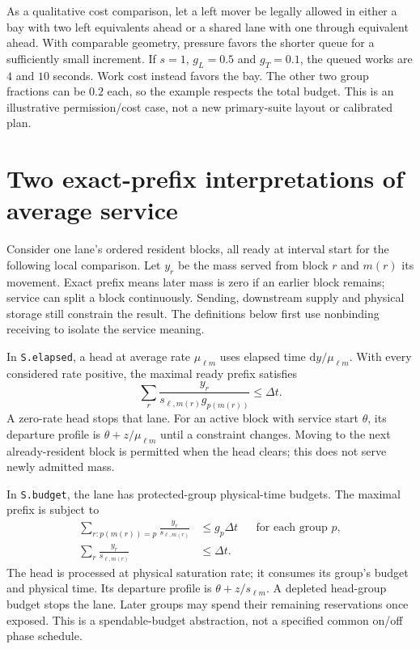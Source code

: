 \documentclass[11pt]{article}
\newcommand{\dd}{\mathrm d}
\begin{document}
As a qualitative cost comparison, let a left mover be legally allowed in either a bay with two left equivalents ahead or a shared lane with one through equivalent ahead. With comparable geometry, pressure favors the shorter queue for a sufficiently small increment. If $s=1$, $g_L=0.5$ and $g_T=0.1$, the queued works are $4$ and $10$ seconds. Work cost instead favors the bay. The other two group fractions can be $0.2$ each, so the example respects the total budget. This is an illustrative permission/cost case, not a new primary-suite layout or calibrated plan.

\section*{Two exact-prefix interpretations of average service}

Consider one lane's ordered resident blocks, all ready at interval start for the following local comparison. Let $y_r$ be the mass served from block $r$ and $m(r)$ its movement. Exact prefix means later mass is zero if an earlier block remains; service can split a block continuously. Sending, downstream supply and physical storage still constrain the result. The definitions below first use nonbinding receiving to isolate the service meaning.

In \texttt{S.elapsed}, a head at average rate $\mu_{\ell m}$ uses elapsed time $\dd y/\mu_{\ell m}$. With every considered rate positive, the maximal ready prefix satisfies
\begin{equation}
 \sum_r\frac{y_r}{s_{\ell,m(r)}g_{p(m(r))}}\le\Delta t.
 \label{eq:elapsed}
\end{equation}
A zero-rate head stops that lane. For an active block with service start $\theta$, its departure profile is $\theta+z/\mu_{\ell m}$ until a constraint changes. Moving to the next already-resident block is permitted when the head clears; this does not serve newly admitted mass.

In \texttt{S.budget}, the lane has protected-group physical-time budgets. The maximal prefix is subject to
\begin{align}
 \sum_{r:p(m(r))=p}\frac{y_r}{s_{\ell,m(r)}}&\le g_p\Delta t
 &&\text{for each group }p,\\
 \sum_r\frac{y_r}{s_{\ell,m(r)}}&\le\Delta t.
 \label{eq:budget}
\end{align}
The head is processed at physical saturation rate; it consumes its group's budget and physical time. Its departure profile is $\theta+z/s_{\ell m}$. A depleted head-group budget stops the lane. Later groups may spend their remaining reservations once exposed. This is a spendable-budget abstraction, not a specified common on/off phase schedule.
\end{document}
